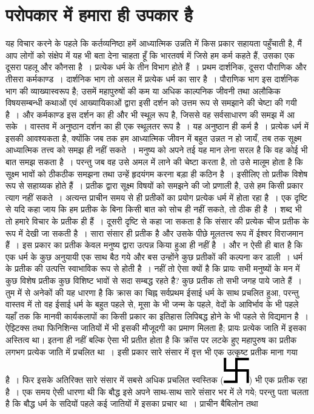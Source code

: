 
\chapter{परोपकार में हमारा ही उपकार है}

यह विचार करने के पहले कि कर्तव्यनिष्ठा हमें आध्यात्मिक उन्नति में किस प्रकार सहायता पहुँचाती है, मैं आप लोगों को संक्षेप में यह भी बता देना चाहता हूँ कि भारतवर्ष में जिसे हम कर्म कहते हैं, उसका एक दूसरा पहलू और कौनसा है~। प्रत्येक धर्म के तीन विभाग होते हैं~। प्रथम दार्शनिक, दूसरा पौराणिक और तीसरा कर्मकाण्ड~। दार्शनिक भाग तो असल में प्रत्येक धर्म का सार है~। पौराणिक भाग इस दार्शनिक भाग की व्याख्यास्वरूप है; उसमें महापुरुषों की कम या अधिक काल्पनिक जीवनी तथा अलौकिक विषयसम्बन्धी कथाओं एवं आख्यायिकाओं द्वारा इसी दर्शन को उत्तम रूप से समझाने की चेष्टा की गयी है~। और कर्मकाण्ड इस दर्शन का ही और भी स्थूल रूप है, जिससे वह सर्वसाधारण की समझ में आ सके~। वास्तव में अनुष्ठान दर्शन का ही एक स्थूलतर रूप है~। यह अनुष्ठान ही कर्म है~। प्रत्येक धर्म में इसकी आवश्यकता है, क्योंकि जब तक हम आध्यात्मिक जीवन में बहुत उन्नत न हो जायँ, तब तक सूक्ष्म आध्यात्मिक तत्त्व को समझ ही नहीं सकते~। मनुष्य को अपने तई यह मान लेना सरल है कि वह कोई भी बात समझ सकता है~। परन्तु जब वह उसे अमल में लाने की चेष्टा करता है, तो उसे मालूम होता है कि सूक्ष्म भावों को ठीकठीक समझना तथा उन्हें हृदयंगम करना बड़ा ही कठिन है~। इसीलिए तो प्रतीक विशेष रूप से सहाय्यक होते हैं~। प्रतीक द्वारा सूक्ष्म विषयों को समझने की जो प्रणाली है, उसे हम किसी प्रकार त्याग नहीं सकते~। अत्यन्त प्राचीन समय से ही प्रतीकों का प्रयोग प्रत्येक धर्म में होता रहा है~। एक दृष्टि से यदि कहा जाय कि हम प्रतीक के बिना किसी बात को सोच ही नहीं सकते, तो ठीक ही है~। शब्द भी तो हमारे विचार के प्रतीक ही हैं~। दूसरी दृष्टि से कहा जा सकता है कि संसार की प्रत्येक चीज प्रतीक के रूप में देखी जा सकती है~। सारा संसार ही प्रतीक है और उसके पीछे मूलतत्त्व रूप में ईश्वर विराजमान हैं~। इस प्रकार का प्रतीक केवल मनुष्य द्वारा उत्पन्न किया हुआ ही नहीं है~। और न ऐसी ही बात है कि एक धर्म के कुछ अनुयायी एक साथ बैठ गये और बस उन्होंने कुछ प्रतीकों की कल्पना कर डाली~। धर्म के प्रतीक की उत्पत्ति स्वाभाविक रूप से होती है~। नहीं तो ऐसा क्यों है कि प्रायः सभी मनुष्यों के मन में कुछ विशेष प्रतीक कुछ विशिष्ट भावों से सदा सम्बद्ध रहते है? कुछ प्रतीक तो सभी जगह पाये जाते हैं~। तुम में से अनेकों की यह धारणा है कि क्रास का चिह्न सर्वप्रथम ईसाई धर्म के साथ प्रचलित हुआ, परन्तु वास्तव में तो वह ईसाई धर्म के बहुत पहले से, मूसा के भी जन्म के पहले, वेदों के आविर्भाव के भी पहले यहाँ तक कि मानवी कार्यकलापों का किसी प्रकार का इतिहास लिपिबद्ध होने के भी पहले से विद्यमान है~। ऐझ्टिक्स तथा फिनिशिन्स जातियों में भी इसकी मौजूदगी का प्रमाण मिलता है; प्रायः प्रत्येक जाति में इसका अस्तित्व था। इतना ही नहीं बल्कि ऐसा भी प्रतीत होता है कि क्रॉस पर लटके हुए महापुरुष का प्रतीक लगभग प्रत्येक जाति में प्रचलित था~। इसी प्रकार सारे संसार में वृत्त भी एक उत्कृष्ट प्रतीक माना गया है~। फिर इसके अतिरिक्त सारे संसार में सबसे अधिक प्रचलित स्वस्तिक (\includegraphics[scale=0.8]{"images/1.png"}) भी एक प्रतीक रहा है~। एक समय ऐसी धारणा थी कि बौद्ध इसे अपने साथ-साथ सारे संसार भर में ले गये; परन्तु पता चलता है कि बौद्ध धर्म के सदियों पहले कई जातियों में इसका प्रचार था~। प्राचीन बैबिलोन तथा 